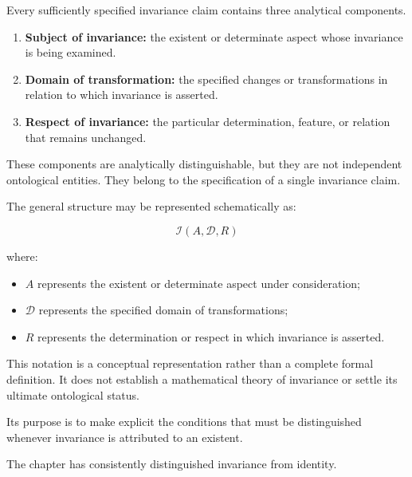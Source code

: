 Every sufficiently specified invariance claim
contains three analytical components.

\begin{enumerate}
    \item \textbf{Subject of invariance:}
    the existent or determinate aspect
    whose invariance is being examined.

    \item \textbf{Domain of transformation:}
    the specified changes or transformations
    in relation to which invariance is asserted.

    \item \textbf{Respect of invariance:}
    the particular determination, feature,
    or relation that remains unchanged.
\end{enumerate}

These components are analytically distinguishable,
but they are not independent ontological entities.
They belong to the specification of a single
invariance claim.

The general structure may be represented
schematically as:

\[
\mathcal{I}(A,\mathcal{D},R)
\]

where:

\begin{itemize}
    \item \(A\) represents the existent or
    determinate aspect under consideration;

    \item \(\mathcal{D}\) represents the
    specified domain of transformations;

    \item \(R\) represents the determination
    or respect in which invariance is asserted.
\end{itemize}

This notation is a conceptual representation
rather than a complete formal definition.
It does not establish a mathematical theory
of invariance or settle its ultimate ontological
status.

Its purpose is to make explicit the conditions
that must be distinguished whenever invariance
is attributed to an existent.


The chapter has consistently distinguished
invariance from identity.

